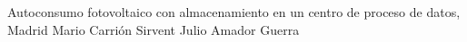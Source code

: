 \documentclass{MUXLaTeX} %
\begin{document}

\maquetacion
{Autoconsumo fotovoltaico con almacenamiento en un centro de proceso de datos, Madrid}          %
{Mario Carrión Sirvent}     %
{Julio Amador Guerra} %




\setcounter{chapter}{5}


\bibliografia
\end{document}
